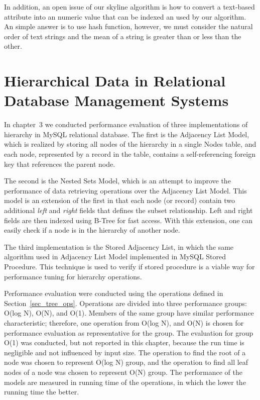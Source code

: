 In addition, an open issue of our skyline algorithm is how to convert a text-based attribute into an numeric value that can be indexed an used by our algorithm. An simple answer is to use hash function, however, we must consider the natural order of text strings and the mean of a string is greater than or less than the other.

\section{Hierarchical Data in Relational Database Management Systems}

In chapter~3 we conducted performance evaluation of three implementations of hierarchy in MySQL relational database. The first is the Adjacency List Model, which is realized by storing all nodes of the hierarchy in a single Nodes table, and each node, represented by a record in the table, contains a self-referencing foreign key that references the parent node.

The second is the Nested Sets Model, which is an attempt to improve the performance of data retrieving operations over the Adjacency List Model. This model is an extension of the first in that each node (or record) contain two additional {\em left} and {\em right} fields that defines the subset relationship. Left and right fields are then indexed using B-Tree for fast access. With this extension, one can easily check if a node is in the hierarchy of another node.

The third implementation is the Stored Adjacency List, in which the same algorithm used in Adjacency List Model implemented in MySQL Stored Procedure. This technique is used to verify if stored procedure is a viable way for performance tuning for hierarchy operations.

Performance evaluation were conducted using the operations defined in Section~\ref{sec_tree_ops}. Operations are divided into three performance groups: O(log N), O(N), and O(1). Members of the same group have similar performance characteristic; therefore, one operation from O(log N), and O(N) is chosen for performance evaluation as representative for the group. The evaluation for group O(1) was conducted, but not reported in this chapter, because the run time is negligible and not influenced by input size. The operation to find the root of a node was chosen to represent O(log N) group, and the operation to find all leaf nodes of a node was chosen to represent O(N) group. The performance of the models are measured in running time of the operations, in which the lower the running time the better.

